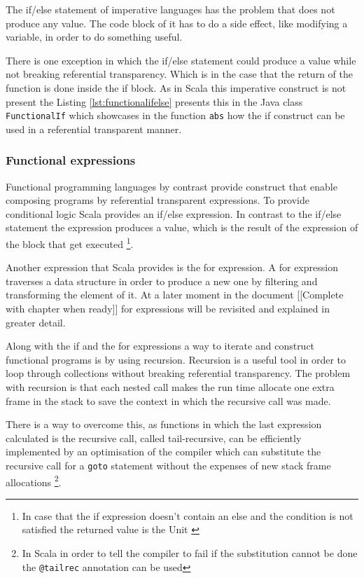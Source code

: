 \documentclass[../main.tex]{subfiles}
\begin{document}
The if/else statement of imperative languages has the problem that does not
produce any value. The code block of it has to do a side effect, like modifying
a variable, in order to do something useful.

There is one exception in which the if/else statement could produce a value
while not breaking referential transparency. Which is in the case that the
return of the function is done inside the if block. As in Scala this imperative
construct is not present the Listing \ref{lst:functionalifelse} presents this in
the Java class \texttt{FunctionalIf} which showcases in the function
\texttt{abs} how the if construct can be used in a referential transparent manner.



\subsubsection{Functional expressions} Functional programming languages by
contrast provide construct that enable composing programs by referential
transparent expressions. To provide conditional logic Scala provides an if/else
expression. In contrast to the if/else statement the expression produces a
value, which is the result of the expression of the block that get executed
\footnote{In case that the if expression doesn't contain an else and the
condition is not satisfied the returned value is the Unit
\autocite{ScalaScala.Unit}}.

Another expression that Scala provides is the for expression. A for expression
traverses a data structure in order to produce a new one by filtering and
transforming the element of it. At a later moment in the document [[Complete
with chapter when ready]] for expressions will be revisited and explained in
greater detail.

Along with the if and the for expressions a way to iterate and construct
functional programs is by using recursion. Recursion is a useful tool in order
to loop through collections without breaking referential transparency. The
problem with recursion is that each nested call makes the run time allocate one
extra frame in the stack to save the context in which the recursive call was
made.

There is a way to overcome this, as functions in which the last expression
calculated is the recursive call, called tail-recursive, can be efficiently
implemented by an optimisation of the compiler which can substitute the
recursive call for a \texttt{goto} statement without the expenses of new stack
frame allocations \autocite{Steele1977DebunkingGoto} \footnote{In Scala in order
to tell the compiler to fail if the substitution cannot be done the
\texttt{@tailrec} annotation can be
used\autocite{ScalaScala.annotation.tailrec}}.
\end{document}

